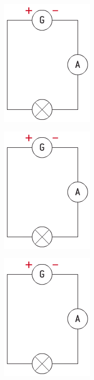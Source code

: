 \documentclass[12pt,a4paper]{article}
\begin{document}
\begin{multicols}{3}
			\begin{center}
				\includegraphics[scale=0.6]{img/schema1}
			\end{center}
			
			\begin{center}
				\includegraphics[scale=0.6]{img/schema1}
			\end{center}
			
			\begin{center}
				\includegraphics[scale=0.6]{img/schema1}
			\end{center}
		\end{multicols}
		
		\newpage
		
\end{document}
